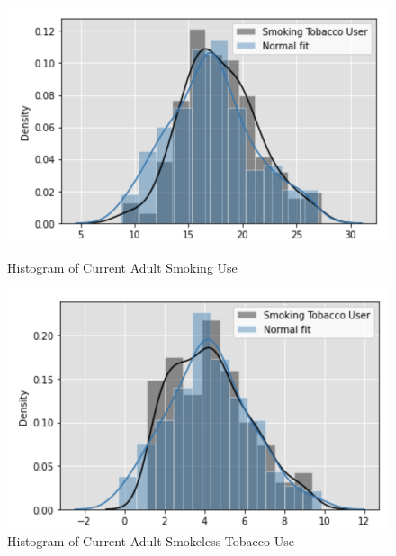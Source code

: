 \documentclass{article}
\begin{document}
\begin{figure}
\raggedright
\begin{minipage}{0.4\textwidth}
  \centering
  \includegraphics[width=1\linewidth]{tob1_2.png}
  \caption{Histogram of Current Adult Smoking Use}
  \label{fig:figure7}
  
\end{minipage}%
\begin{minipage}{0.4\textwidth}
  \centering
  \includegraphics[width=1\linewidth]{tob2_2.png}
  \caption{Histogram of Current Adult Smokeless Tobacco Use}
  \label{fig:figure8}
\end{minipage}
\end{figure}
\end{document}
